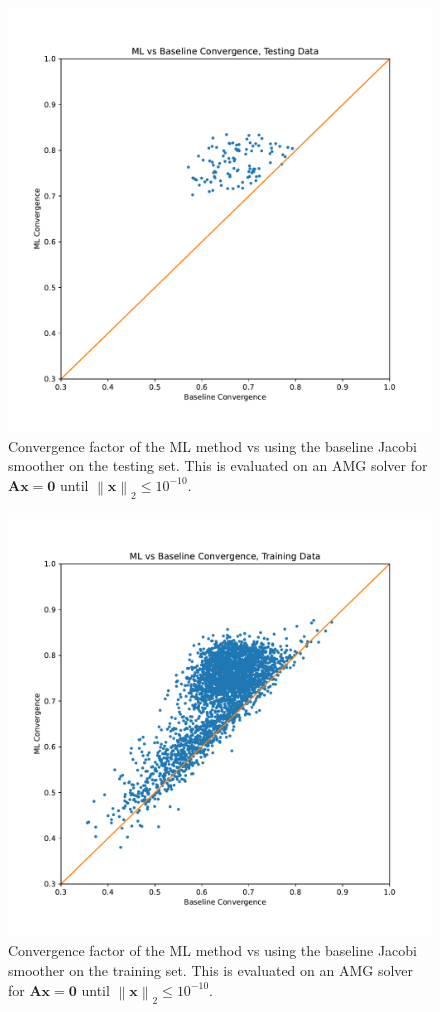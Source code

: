 \documentclass{article}
\newcommand{\normtwo}[1]{\left\lVert#1\right\rVert_2}
\newcommand{\mat}[1]{\bm{{#1}}}
\renewcommand{\vec}[1]{\bm{{#1}}}
\begin{document}
\begin{figure}[h]
  \includegraphics[width=\textwidth]{figures/testing_conv_perf.pdf}
  \caption{Convergence factor of the ML method vs using the baseline Jacobi smoother on the testing set.  This is evaluated on an AMG solver for $\mat{Ax}=\vec{0}$ until $\normtwo{\vec{x}} \leq 10^{-10}$.}
  \label{fig:testing_perf}
\end{figure}

\begin{figure}[h]
  \includegraphics[width=\textwidth]{figures/training_conv_perf.pdf}
  \caption{Convergence factor of the ML method vs using the baseline Jacobi smoother on the training set.  This is evaluated on an AMG solver for $\mat{Ax}=\vec{0}$ until $\normtwo{\vec{x}} \leq 10^{-10}$.}
  \label{fig:testing_perf}
\end{figure}
\end{document}
